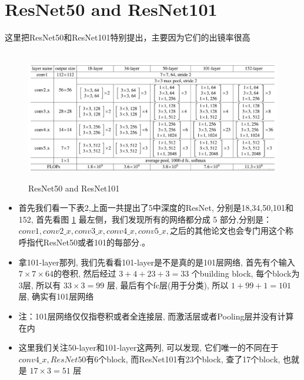 \documentclass[12pt]{ctexart}%
\begin{document}
	\section{\quad ResNet50 and ResNet101}
		这里把ResNet50和ResNet101特别提出，主要因为它们的出镜率很高
			\begin{figure}[H]
				\vspace{-0.2cm}  %
				\setlength{\abovecaptionskip}{-0.2cm}   %
				\centering
				\includegraphics[scale=0.5]{ResNet50_and_ResNet101.png}
				\renewcommand{\figurename}{Fig} %
				\caption{ResNet50 and ResNet101}
				\label{fig16:ResNet50 and ResNet101 }
			\end{figure}
		\begin{itemize}
			\item 首先我们看一下表2,上面一共提出了5中深度的ResNet, 分别是18,34,50,101和152, 首先看图 \ref{fig16:ResNet50 and ResNet101 } 最左侧，我们发现所有的网络都分成 5 部分,分别是：$conv1,conv2\_x,conv3\_x,conv4\_x,conv5\_x,$之后的其他论文也会专门用这个称呼指代ResNet50或者101的每部分.。
	
			\item 拿101-layer那列, 我们先看看101-layer是不是真的是101层网络, 首先有个输入 $7\times 7\times 64$的卷积, 然后经过 $3 + 4 + 23 + 3 = 33$ 个building block, 每个block为3层, 所以有 $33 \times 3 = 99$ 层, 最后有个fc层(用于分类), 所以 $1 + 99 + 1 = 101$ 层, 确实有101层网络

			\item 注：101层网络仅仅指卷积或者全连接层, 而激活层或者Pooling层并没有计算在内
			
			\item 这里我们关注50-layer和101-layer这两列, 可以发现, 它们唯一的不同在于$conv4\_x, ResNet50$有6个block, 而ResNet101有23个block, 查了17个block, 也就是 $17 \times 3 = 51$ 层
		\end{itemize}
	
\end{document}
